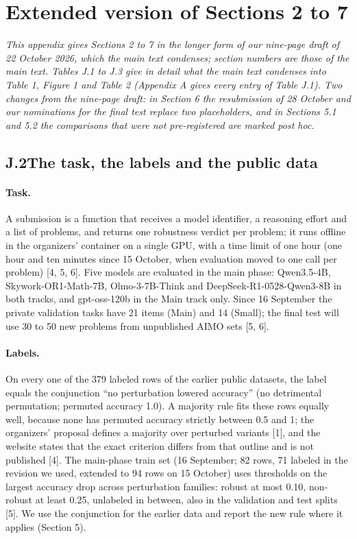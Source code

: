 \section{Extended version of Sections 2 to 7}\label{app:J}

\emph{This appendix gives Sections 2 to 7 in the longer form of our nine-page draft of 22 October 2026, which the main text condenses; section numbers are those of the main text. Tables J.1 to J.3 give in detail what the main text condenses into Table 1, Figure 1 and Table 2 (Appendix A gives every entry of Table J.1). Two changes from the nine-page draft: in Section 6 the resubmission of 28 October and our nominations for the final test replace two placeholders, and in Sections 5.1 and 5.2 the comparisons that were not pre-registered are marked post hoc.}

\subsection*{J.2\quad The task, the labels and the public data}

\paragraph{Task.}
A submission is a function that receives a model identifier, a reasoning effort and a list of problems, and returns one robustness verdict per problem; it runs offline in the organizers' container on a single GPU, with a time limit of one hour (one hour and ten minutes since 15 October, when evaluation moved to one call per problem) [4, 5, 6]. Five models are evaluated in the main phase: Qwen3.5-4B, Skywork-OR1-Math-7B, Olmo-3-7B-Think and DeepSeek-R1-0528-Qwen3-8B in both tracks, and gpt-oss-120b in the Main track only. Since 16 September the private validation tasks have 21 items (Main) and 14 (Small); the final test will use 30 to 50 new problems from unpublished AIMO sets [5, 6].

\paragraph{Labels.}
On every one of the 379 labeled rows of the earlier public datasets, the label equals the conjunction ``no perturbation lowered accuracy'' (no detrimental permutation; permuted accuracy 1.0). A majority rule fits these rows equally well, because none has permuted accuracy strictly between 0.5 and 1; the organizers' proposal defines a majority over perturbed variants [1], and the website states that the exact criterion differs from that outline and is not published [4]. The main-phase train set (16 September; 82 rows, 71 labeled in the revision we used, extended to 94 rows on 15 October) uses thresholds on the largest accuracy drop across perturbation families: robust at most 0.10, non-robust at least 0.25, unlabeled in between, also in the validation and test splits [5]. We use the conjunction for the earlier data and report the new rule where it applies (Section 5).

